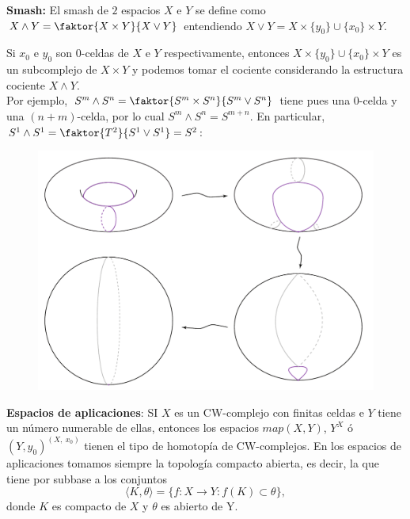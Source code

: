 \textbf{Smash:} El smash de $2$ espacios $X$ e $Y$  se define como $X \wedge Y = \faktor{X \times Y}{X \vee Y}$ entendiendo $X \vee Y = X \times \{y_0\} \cup \{x_0\} \times Y$. \par 
Si $x_0$ e $y_0$ son $0$-celdas de $X$ e $Y$ respectivamente, entonces $X \times \{y_0\} \cup \{x_0\} \times Y$ es un subcomplejo de $X \times Y$ y podemos tomar el cociente considerando la estructura cociente $X \wedge Y$. \\
Por ejemplo, $S^m \wedge S^n = \faktor{S^m \times S^n}{S^m \vee S^n}$ tiene pues una $0$-celda y una $(n+m)$-celda, por lo cual $S^m \wedge S^n = S^{m+n}$. En particular, $S^1 \wedge S^1 = \faktor{T^2}{S^1 \vee S^1} = S^2$: \par 
\begin{figure}[h]
\centering
\includegraphics[width = 0.6\linewidth]{images/smashs2}
\end{figure}

\textbf{Espacios de aplicaciones}: SI $X$ es un CW-complejo con finitas celdas e $Y$ tiene un número numerable de ellas, entonces los espacios
$map(X,Y)$, $Y^X$ ó $(Y, y_0)^{(X, \ x_0)}$ tienen el tipo de homotopía de CW-complejos. En los espacios de aplicaciones tomamos siempre la topología compacto abierta, es decir, la que tiene por subbase a los conjuntos 
\[ \langle K, \theta \rangle = \{f:X \longrightarrow Y : f(K) \subset \theta \}, \]
donde $K$ es compacto de $X$ y $\theta$ es abierto de Y.

